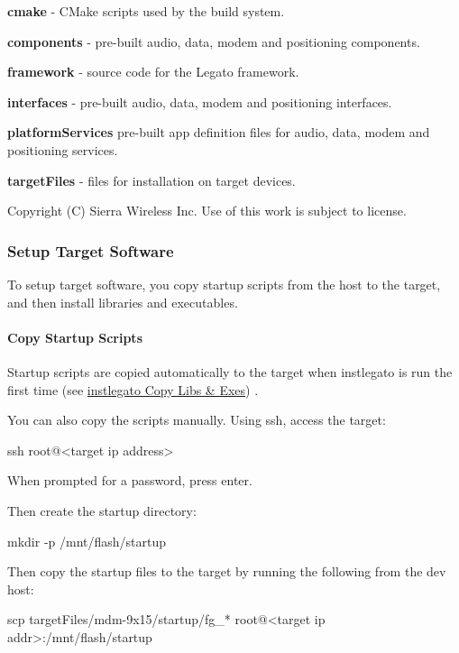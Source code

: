 {\bfseries cmake } -\/ C\+Make scripts used by the build system.

{\bfseries components } -\/ pre-\/built audio, data, modem and positioning components.

{\bfseries framework} -\/ source code for the Legato framework.

{\bfseries interfaces } -\/ pre-\/built audio, data, modem and positioning interfaces.

{\bfseries platform\+Services } pre-\/built app definition files for audio, data, modem and positioning services.

{\bfseries target\+Files } -\/ files for installation on target devices.





Copyright (C) Sierra Wireless Inc. Use of this work is subject to license. \hypertarget{getstartedTargetSW}{}\subsubsection{Setup Target Software}\label{getstartedTargetSW}
To setup target software, you copy startup scripts from the host to the target, and then install libraries and executables.\hypertarget{getstarted_target_s_w_getstartedTargetSetup_copyStartScripts}{}\paragraph{Copy Startup Scripts}\label{getstarted_target_s_w_getstartedTargetSetup_copyStartScripts}
Startup scripts are copied automatically to the target when {\ttfamily instlegato} is run the first time (see \hyperlink{getstarted_target_s_w_getstartedTargetSetup_copyLibExe}{instlegato Copy Libs \& Exes}) .

You can also copy the scripts manually. Using ssh, access the target\+:


\begin{DoxyCode}
ssh root@<target ip address> 
\end{DoxyCode}
 When prompted for a password, press enter.

Then create the startup directory\+: 
\begin{DoxyCode}
mkdir -p  /mnt/flash/startup 
\end{DoxyCode}


Then copy the startup files to the target by running the following from the dev host\+: 
\begin{DoxyCode}
scp targetFiles/mdm-9x15/startup/fg\_* root@<target ip addr>:/mnt/flash/startup
\end{DoxyCode}


